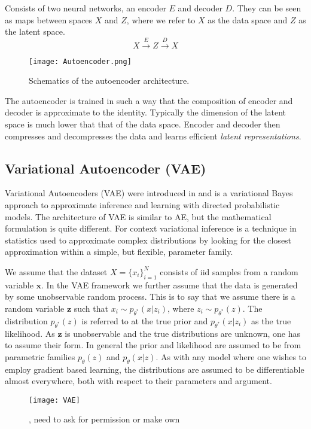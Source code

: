 \documentclass[../../thesis.tex]{subfiles}
\begin{document}
Consists of two neural networks, an encoder $E$ and decoder $D$. They can be seen as maps between spaces $X$ and $Z$, where we refer to $X$ as the data space and $Z$ as the latent space. 
\begin{equation}
    X \xrightarrow{E} Z \xrightarrow{D} X 
\end{equation}

\begin{figure}[h]
    \texttt{[image: Autoencoder.png]}
    \centering
    \caption{Schematics of the autoencoder architecture.}
    \label{fig:autoencoder}
\end{figure}

The autoencoder is trained in such a way that the composition of encoder and decoder is approximate to the identity. Typically the dimension of the latent space is much lower that that of the data space. Encoder and decoder then compresses and decompresses the data and learns efficient \textit{latent representations}. 

\subsection{Variational Autoencoder (VAE)}
Variational Autoencoders (VAE) were introduced in \cite{kingma2022autoencoding} and is a variational Bayes approach to approximate inference and learning with directed probabilistic models. The architecture of VAE is similar to AE, but the mathematical formulation is quite different. For context variational inference is a technique in statistics used to approximate complex distributions by looking for the closest approximation within a simple, but flexible, parameter family. \newline 


We assume that the dataset $X = \{x_i\}_{i=1}^{N}$ consists of iid samples from a random variable $\mathbf{x}$. In the VAE framework we further assume that the data is generated by some unobservable random process. This is to say that we assume there is a random variable $\mathbf{z}$ such that $x_i \sim p_{\theta^*}(x|z_i)$, where $z_i \sim p_{\theta^*}(z)$. The distribution $p_{\theta^*}(z)$ is referred to at the true prior and $p_{\theta^*}(x|z_i)$ as the true likelihood. As $\mathbf{z}$ is unobservable and the true distributions are unknown, one has to assume their form. In general the prior and likelihood are assumed to be from parametric families $p_{\theta}(z)$ and $p_{\theta}(x|z)$. As with any model where one wishes to employ gradient based learning, the distributions are assumed to be differentiable almost everywhere, both with respect to their parameters and argument.\newline
\begin{figure}[h]
    \texttt{[image: VAE]}
    \centering  
    \caption{\cite{VAE}, need to ask for permission or make own}  
\end{figure}
\end{document}
